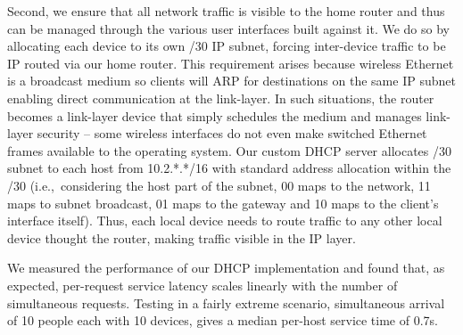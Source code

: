 Second, we ensure that all network traffic is visible to the home
router and thus can be managed through the various user interfaces
built against it.  We do so by allocating each device to its own /30
IP subnet, forcing inter-device traffic to be IP routed via our home
router.  This requirement arises because wireless Ethernet is a
broadcast medium so clients will ARP for destinations on the same IP
subnet enabling direct communication at the link-layer.  In such
situations, the router becomes a link-layer device that simply
schedules the medium and manages link-layer security -- some wireless
interfaces do not even make switched Ethernet frames available to the
operating system. %
Our custom DHCP server allocates /30 subnet to each host from
10.2.*.*/16 with standard address allocation within the /30
(i.e.,~considering the host part of the subnet, 00 maps to the
network, 11 maps to subnet broadcast, 01 maps to the gateway and 10
maps to the client's interface itself). Thus, each local device needs
to route traffic to any other local device thought the router, making
traffic visible in the IP layer.
%

We measured the performance of our DHCP implementation and found that,
as expected, per-request service latency scales linearly with the
number of simultaneous requests.  Testing in a fairly extreme
scenario, simultaneous arrival of 10 people each with 10 devices,  gives
a median per-host service time of 0.7s.

